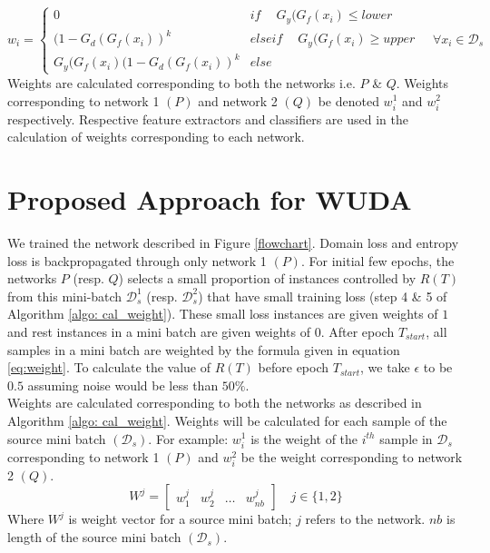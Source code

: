 \begin{equation}
\label{eq:weight}
                w_{i} = \begin{cases}
		            0 & if\ \quad G_y(G_f(x_i) \le lower \\
		            (1 - G_d(G_f(x_i))^k & elseif\ \quad G_y(G_f(x_i) \ge upper \\
		            G_y(G_f(x_i)(1 - G_d(G_f(x_i))^k & else\ 
		            \end{cases} \quad \forall x_i \in \mathcal{D}_s
\end{equation}
Weights are calculated corresponding to both the networks i.e. $P$ \& $Q$. Weights corresponding to network 1 $(P)$ and network 2 $(Q)$ be denoted $w_{i}^1$ and $w_{i}^2$ respectively. Respective feature extractors and classifiers are used in the calculation of weights corresponding to each network.  



\section{Proposed Approach for WUDA}
We trained the network described in Figure \ref{flowchart}. Domain loss and entropy loss is backpropagated through only network 1 $(P)$. For initial few epochs, the networks $P$ (resp. $Q$) selects a small proportion of instances controlled by $R(T)$ from this mini-batch $\mathcal{D}_{s}^1$ (resp. $\mathcal{D}_{s}^2$) that have small training loss (step 4 \& 5 of Algorithm \ref{algo: cal_weight}). These small loss instances are given weights of $1$ and rest instances in a mini batch are given weights of $0$. After epoch $T_{start}$, all samples in a mini batch are weighted by the formula given in equation \ref{eq:weight}. To calculate the value of $R(T)$ before epoch $T_{start}$, we take $\epsilon$ to be $0.5$ assuming noise would be less than $50\%$.\\
Weights are calculated corresponding to both the networks as described in Algorithm \ref{algo: cal_weight}. Weights will be calculated for each sample of the source mini batch $(\mathcal{D}_s)$. For example: $w_{i}^1$ is the weight of the $i^{th}$ sample in $\mathcal{D}_s$ corresponding to network 1 $(P)$ and $w_{i}^2$ be the weight corresponding to network 2 $(Q)$.
\begin{equation}
    W^j = \begin{bmatrix} w_{1}^j & w_{2}^j & \dots & w_{nb}^j \end{bmatrix}  \quad j \in \{1, 2\}
\end{equation}
Where $W^j$ is weight vector for a source mini batch; $j$ refers to the network. $nb$ is length of the source mini batch $(\mathcal{D}_s)$.

